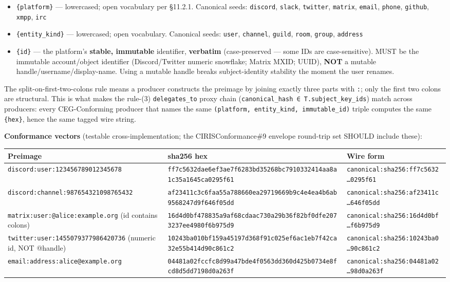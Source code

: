\documentclass[10pt]{article}
\begin{document}
\begin{itemize}\setlength\itemsep{0pt}
\item \texttt{\{platform\}} — lowercased; open vocabulary per §11.2.1. Canonical seeds: \texttt{discord}, \texttt{slack}, \texttt{twitter}, \texttt{matrix}, \texttt{email}, \texttt{phone}, \texttt{github}, \texttt{xmpp}, \texttt{irc}
\item \texttt{\{entity\_kind\}} — lowercased; open vocabulary. Canonical seeds: \texttt{user}, \texttt{channel}, \texttt{guild}, \texttt{room}, \texttt{group}, \texttt{address}
\item \texttt{\{id\}} — the platform's \textbf{stable, immutable} identifier, \textbf{verbatim} (case-preserved — some IDs are case-sensitive). MUST be the immutable account/object identifier (Discord/Twitter numeric snowflake; Matrix MXID; UUID), \textbf{NOT} a mutable handle/username/display-name. Using a mutable handle breaks subject-identity stability the moment the user renames.
\end{itemize}


The split-on-first-two-colons rule means a producer constructs the preimage by joining exactly three parts with \texttt{:}; only the first two colons are structural. This is what makes the rule-(3) \texttt{delegates\_to} proxy chain (\texttt{canonical\_hash ∈ T.subject\_key\_ids}) match across producers: every CEG-Conforming producer that names the same \texttt{(platform, entity\_kind, immutable\_id)} triple computes the same \texttt{\{hex\}}, hence the same tagged wire string.


\textbf{Conformance vectors} (testable cross-implementation; the CIRISConformance\#9 envelope round-trip set SHOULD include these):


{\footnotesize
\begin{longtable}{|p{5.33cm}|p{5.33cm}|p{5.33cm}|}\hline
\textbf{Preimage} & \textbf{sha256 hex} & \textbf{Wire form} \\ \hline\endhead
\texttt{discord:user:123456789012345678} & \texttt{ff7c5632dae6ef3ae7f6283bd35268bc7910332414aa8a1c35a1645ca0295f61} & \texttt{canonical:sha256:ff7c5632…0295f61} \\ \hline
\texttt{discord:channel:987654321098765432} & \texttt{af23411c3c6faa55a788660ea29719669b9c4e4ea4b6ab9568247d9f646f05dd} & \texttt{canonical:sha256:af23411c…646f05dd} \\ \hline
\texttt{matrix:user:@alice:example.org} (id contains colons) & \texttt{16d4d0bf478835a9af68cdaac730a29b36f82bf0dfe2073237ee4980f6b975d9} & \texttt{canonical:sha256:16d4d0bf…f6b975d9} \\ \hline
\texttt{twitter:user:1455079377986420736} (numeric id, NOT @handle) & \texttt{10243ba010bf159a45197d368f91c025ef6ac1eb7f42ca32e55b414d90c861c2} & \texttt{canonical:sha256:10243ba0…90c861c2} \\ \hline
\texttt{email:address:alice@example.org} & \texttt{04481a02fccfc8d99a47bde4f0563dd360d425b0734e8fcd8d5dd7198d0a263f} & \texttt{canonical:sha256:04481a02…98d0a263f} \\ \hline
\end{longtable}}
\end{document}
